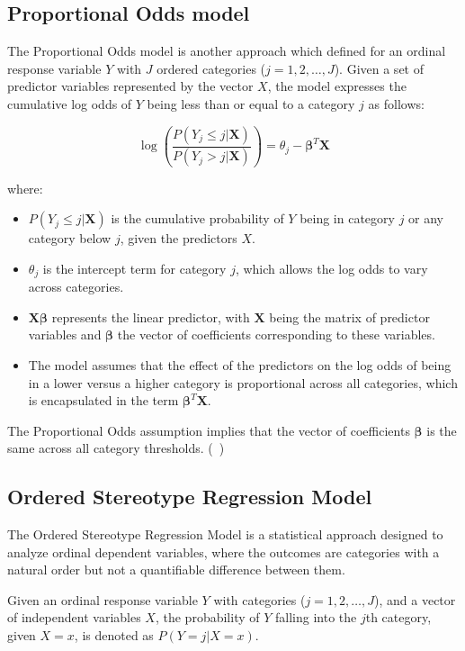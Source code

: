 \documentclass{article}
\begin{document}
\subsection{Proportional Odds model}

The Proportional Odds model is another approach which defined for an ordinal response variable $Y$ with $J$ ordered categories ($j=1, 2, \ldots, J$). 
Given a set of predictor variables represented by the vector $X$, the model expresses the cumulative log odds of $Y$ being less than or equal to a category $j$ as follows:

\[
\log\left(\frac{P(Y_j \leq j | \mathbf{X})}{P(Y_j > j | \mathbf{X})}\right) = \theta_j - \boldsymbol{\beta}^T\mathbf{X}
\]

where:
\begin{itemize}
    \item $P(Y_j \leq j | \mathbf{X})$ is the cumulative probability of $Y$ being in category $j$ or any category below $j$, given the predictors $X$.
    \item $\theta_j$ is the intercept term for category $j$, which allows the log odds to vary across categories.
    \item $\mathbf{X}\boldsymbol{\beta}$ represents the linear predictor, with $\mathbf{X}$ being the matrix of predictor variables and $\boldsymbol{\beta}$ the vector of coefficients corresponding to these variables.
    \item The model assumes that the effect of the predictors on the log odds of being in a lower versus a higher category is proportional across all categories, which is encapsulated in the term $\boldsymbol{\beta}^T\mathbf{X}$.
\end{itemize}

The Proportional Odds assumption implies that the vector of coefficients $\boldsymbol{\beta}$ is the same across all category thresholds. (~\cite{mccullagh1980regression})


\subsection{Ordered Stereotype Regression Model}

The Ordered Stereotype Regression Model is a statistical approach designed to analyze ordinal dependent variables, where the outcomes are categories with a natural order but not a quantifiable difference between them.

Given an ordinal response variable $Y$ with categories ($j=1, 2, \ldots, J$), and a vector of independent variables $X$, the probability of $Y$ falling into the $j$th category, given $X = x$, is denoted as $P(Y = j | X = x)$.
\end{document}
